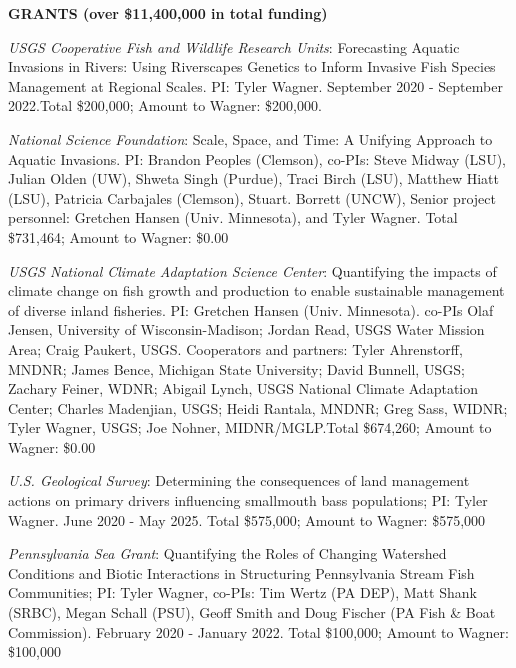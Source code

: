 \documentclass[10pt]{article}
\begin{document}
\begin{flushleft}
\begin{etaremune}
\end{etaremune}

\centerline {\bf{GRANTS (over \$11,400,000 in total funding)}}
\vspace{5pt}
\begin{etaremune}

\item \textit{USGS Cooperative Fish and Wildlife Research Units}:  Forecasting Aquatic Invasions in Rivers: Using Riverscapes Genetics to Inform Invasive Fish Species Management at Regional Scales. PI: Tyler Wagner. September 2020 - September 2022.Total \$200,000; Amount to Wagner: \$200,000.  

\item \textit{National Science Foundation}: Scale, Space, and Time: A Unifying Approach to Aquatic Invasions. PI: Brandon Peoples (Clemson), co-PIs: Steve Midway (LSU), Julian Olden (UW), Shweta
 Singh (Purdue), Traci Birch (LSU), Matthew Hiatt (LSU), Patricia Carbajales (Clemson), Stuart. Borrett (UNCW), Senior project personnel: Gretchen Hansen (Univ. Minnesota), and Tyler Wagner. Total \$731,464; Amount to Wagner: \$0.00


\item {\sl USGS National Climate Adaptation Science Center}: Quantifying the impacts of climate change on fish growth and production to enable sustainable management of diverse inland fisheries. PI: Gretchen Hansen (Univ. Minnesota). co-PIs Olaf Jensen, University of Wisconsin-Madison; Jordan Read, USGS Water Mission Area; Craig Paukert, USGS. Cooperators and partners: Tyler Ahrenstorff, MNDNR; James Bence, Michigan State University; David Bunnell, USGS; Zachary Feiner, WDNR; Abigail Lynch, USGS National Climate Adaptation Center; Charles Madenjian, USGS; Heidi Rantala, MNDNR; Greg Sass, WIDNR; Tyler Wagner, USGS; Joe Nohner, MIDNR/MGLP.Total \$674,260; Amount to Wagner: \$0.00

\item {\sl U.S. Geological Survey}: Determining the consequences of land management actions on primary drivers influencing smallmouth bass populations; PI: Tyler Wagner. June 2020 - May 2025. Total \$575,000; Amount to Wagner: \$575,000

\item {\sl Pennsylvania Sea Grant}: Quantifying the Roles of Changing Watershed Conditions and Biotic Interactions in Structuring Pennsylvania Stream Fish Communities; PI: Tyler Wagner, co-PIs: Tim Wertz (PA DEP), Matt Shank (SRBC), Megan Schall (PSU), Geoff Smith and Doug Fischer (PA Fish \& Boat Commission). February 2020 - January 2022. Total \$100,000; Amount to Wagner: \$100,000


\end{etaremune}
\end{flushleft}
\end{document}
